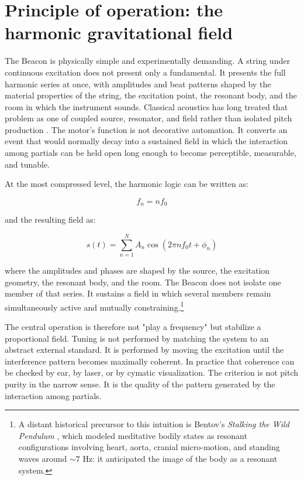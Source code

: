 \section{Principle of operation: the harmonic gravitational field}


The Beacon is physically simple and experimentally demanding. A string under continuous excitation does not present only a fundamental. It presents the full harmonic series at once, with amplitudes and beat patterns shaped by the material properties of the string, the excitation point, the resonant body, and the room in which the instrument sounds. Classical acoustics has long treated that problem as one of coupled source, resonator, and field rather than isolated pitch production \parencite{rayleigh_1877, benade_1973, fletcher_1996}. The motor's function is not decorative automation. It converts an event that would normally decay into a sustained field in which the interaction among partials can be held open long enough to become perceptible, measurable, and tunable.

At the most compressed level, the harmonic logic can be written as:

$$
f_n = n f_0
$$

and the resulting field as:

$$
s(t) = \sum_{n=1}^{N} A_n \cos(2 \pi n f_0 t + \phi_n)
$$

where the amplitudes and phases are shaped by the source, the excitation geometry, the resonant body, and the room. The Beacon does not isolate one member of that series. It sustains a field in which several members remain simultaneously active and mutually constraining.\footnote{A distant historical precursor to this intuition is Bentov's \textit{Stalking the Wild Pendulum} \parencite{bentov_1977}, which modeled meditative bodily states as resonant configurations involving heart, aorta, cranial micro-motion, and standing waves around $\sim 7$ Hz: it anticipated the image of the body as a resonant system.}

The central operation is therefore not "play a frequency" but stabilize a proportional field. Tuning is not performed by matching the system to an abstract external standard. It is performed by moving the excitation until the interference pattern becomes maximally coherent. In practice that coherence can be checked by ear, by laser, or by cymatic visualization. The criterion is not pitch purity in the narrow sense. It is the quality of the pattern generated by the interaction among partials.

